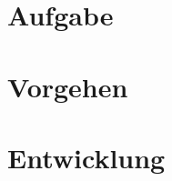 %
%
%


\begin{frame}
\titlepage
\end{frame}

\section{Aufgabe}
	
\section{Vorgehen}
	
\section{Entwicklung}
	